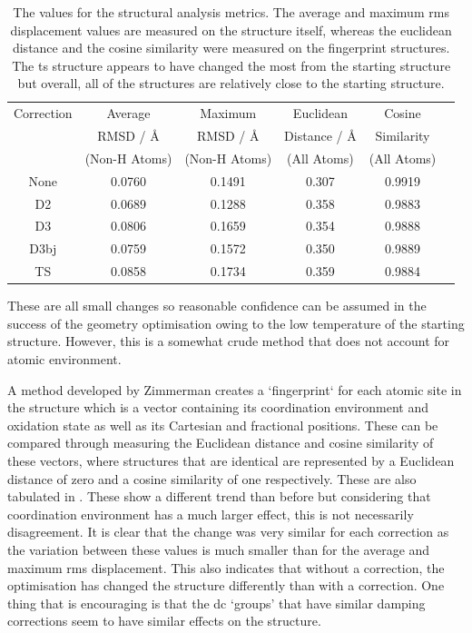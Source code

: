 \begin{table}[h]
\centering
\begin{tabular}{@{}cccccc@{}}
\toprule
Correction & Average & Maximum & Euclidean & Cosine \\
 & RMSD / {\AA} & RMSD / {\AA} & Distance / {\AA} & Similarity \\ 
 & (Non-H Atoms) & (Non-H Atoms) & (All Atoms) & (All Atoms) \\ \midrule
None &
  0.0760 &
  0.1491 &
  0.307 &
  0.9919 \\
D2 &
  0.0689 &
  0.1288 &
  0.358 &
  0.9883 \\
D3 &
 0.0806 & 
 0.1659 &
 0.354  & 
 0.9888 & \\
D3\acrshort{bj} &
  0.0759 &
  0.1572 &
  0.350 &
  0.9889 \\
TS &
  0.0858 &
  0.1734 &
  0.359 &
  0.9884 \\ \bottomrule
\end{tabular}
\captionsetup{font = footnotesize, justification = centering}
\caption[The Values for the Structural Analysis Metrics]{The values for the structural analysis metrics. The average and maximum \acrshort{rms} displacement values are measured on the structure itself, whereas the euclidean distance and the cosine similarity were measured on the fingerprint structures. The \acrshort{ts} structure appears to have changed the most from the starting structure but overall, all of the structures are relatively close to the starting structure.}
\label{tab:struct_similarity}
\end{table}

These are all small changes so reasonable confidence can be assumed in the success of the geometry optimisation owing to the low temperature of the starting structure. However, this is a somewhat crude method that does not account for atomic environment. 

A method developed by Zimmerman \cite{Ward2018} creates a `fingerprint` for each atomic site in the structure which is a vector containing its coordination environment and oxidation state as well as its Cartesian and fractional positions. These can be compared through measuring the Euclidean distance and cosine similarity of these vectors, where structures that are identical are represented by a Euclidean distance of zero and a cosine similarity of one respectively. These are also tabulated in . These show a different trend than before but considering that coordination environment has a much larger effect, this is not necessarily disagreement. It is clear that the change was very similar for each correction as the variation between these values is much smaller than for the average and maximum \acrshort{rms} displacement. This also indicates that without a correction, the optimisation has changed the structure differently than with a correction. One thing that is encouraging is that the \acrshort{dc} ‘groups’ that have similar damping corrections seem to have similar effects on the structure. 

